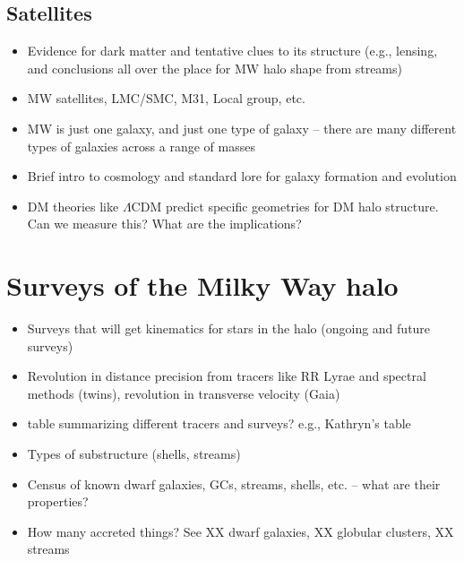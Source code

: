 \subsection{Satellites}

\begin{itemize}
	\item Evidence for dark matter and tentative clues to its structure (e.g., lensing, and conclusions all over the place for MW halo shape from streams)
	\item MW satellites, LMC/SMC, M31, Local group, etc.
	\item MW is just one galaxy, and just one type of galaxy -- there are many different types of galaxies across a range of masses
	\item Brief intro to cosmology and standard lore for galaxy formation and evolution
	\item DM theories like $\Lambda$CDM predict specific geometries for DM halo structure. Can we measure this? What are the implications?
\end{itemize}

\section{Surveys of the Milky Way halo}\label{sec:surveys}

\begin{itemize}
	\item Surveys that will get kinematics for stars in the halo (ongoing and future surveys)
	\item Revolution in distance precision from tracers like RR Lyrae and spectral methods (twins), revolution in transverse velocity (Gaia)
	\item table summarizing different tracers and surveys? e.g., Kathryn's table
	\item Types of substructure (shells, streams)
	\item Census of known dwarf galaxies, GCs, streams, shells, etc. -- what are their properties?
	\item How many accreted things? See XX dwarf galaxies, XX globular clusters, XX streams
\end{itemize}




